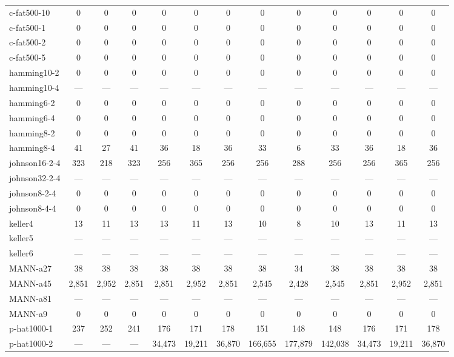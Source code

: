 \documentclass{l4proj}
\begin{document}
\begin{table}
\begin{center}
\begin{tiny}
\begin{tabular}{|l|c c c|c c c|c c c|c c c|}
c-fat500-10 & 0 & 0 & 0 & 0 & 0 & 0 & 0 & 0 & 0 & 0 & 0 & 0 \\ 
c-fat500-1 & 0 & 0 & 0 & 0 & 0 & 0 & 0 & 0 & 0 & 0 & 0 & 0 \\ 
c-fat500-2 & 0 & 0 & 0 & 0 & 0 & 0 & 0 & 0 & 0 & 0 & 0 & 0 \\ 
c-fat500-5 & 0 & 0 & 0 & 0 & 0 & 0 & 0 & 0 & 0 & 0 & 0 & 0 \\ 
hamming10-2 & 0 & 0 & 0 & 0 & 0 & 0 & 0 & 0 & 0 & 0 & 0 & 0 \\ 
hamming10-4 & --- & --- & --- & --- & --- & --- & --- & --- & --- & --- & --- & --- \\ 
hamming6-2 & 0 & 0 & 0 & 0 & 0 & 0 & 0 & 0 & 0 & 0 & 0 & 0 \\ 
hamming6-4 & 0 & 0 & 0 & 0 & 0 & 0 & 0 & 0 & 0 & 0 & 0 & 0 \\ 
hamming8-2 & 0 & 0 & 0 & 0 & 0 & 0 & 0 & 0 & 0 & 0 & 0 & 0 \\ 
hamming8-4 & 41 & 27 & 41 & 36 & 18 & 36 & 33 & 6 & 33 & 36 & 18 & 36 \\ 
johnson16-2-4 & 323 & 218 & 323 & 256 & 365 & 256 & 256 & 288 & 256 & 256 & 365 & 256 \\ 
johnson32-2-4 & --- & --- & --- & --- & --- & --- & --- & --- & --- & --- & --- & --- \\ 
johnson8-2-4 & 0 & 0 & 0 & 0 & 0 & 0 & 0 & 0 & 0 & 0 & 0 & 0 \\ 
johnson8-4-4 & 0 & 0 & 0 & 0 & 0 & 0 & 0 & 0 & 0 & 0 & 0 & 0 \\ 
keller4 & 13 & 11 & 13 & 13 & 11 & 13 & 10 & 8 & 10 & 13 & 11 & 13 \\ 
keller5 & --- & --- & --- & --- & --- & --- & --- & --- & --- & --- & --- & --- \\ 
keller6 & --- & --- & --- & --- & --- & --- & --- & --- & --- & --- & --- & --- \\ 
MANN-a27 & 38 & 38 & 38 & 38 & 38 & 38 & 38 & 34 & 38 & 38 & 38 & 38 \\ 
MANN-a45 & 2,851 & 2,952 & 2,851 & 2,851 & 2,952 & 2,851 & 2,545 & 2,428 & 2,545 & 2,851 & 2,952 & 2,851 \\ 
MANN-a81 & --- & --- & --- & --- & --- & --- & --- & --- & --- & --- & --- & --- \\ 
MANN-a9 & 0 & 0 & 0 & 0 & 0 & 0 & 0 & 0 & 0 & 0 & 0 & 0 \\ 
p-hat1000-1 & 237 & 252 & 241 & 176 & 171 & 178 & 151 & 148 & 148 & 176 & 171 & 178 \\ 
p-hat1000-2 & --- & --- & --- & 34,473 & 19,211 & 36,870 & 166,655 & 177,879 & 142,038 & 34,473 & 19,211 & 36,870 \\ 

\end{tabular}
\end{tiny}
\end{center}
\end{table}
\end{document}
